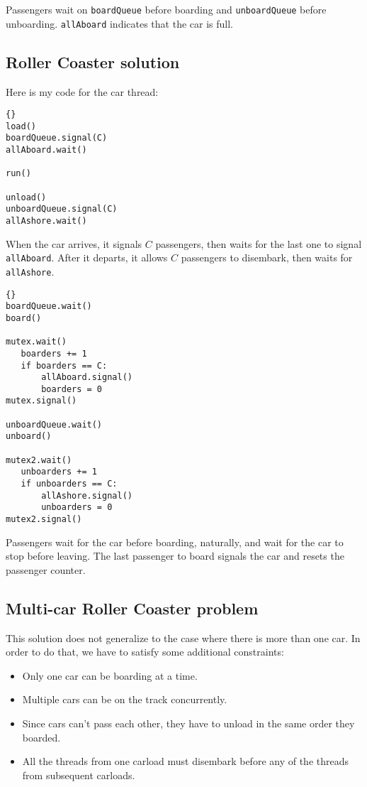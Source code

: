 \documentclass{book}
\newcommand{\clearemptydoublepage}{\newpage\cleardoublepage}
\begin{document}
Passengers wait on {\tt boardQueue} before boarding and
{\tt unboardQueue} before unboarding.  {\tt allAboard}
indicates that the car is full.


\clearemptydoublepage
\subsection{Roller Coaster solution}

Here is my code for the car thread:

\begin{lstlisting}[title={Roller Coaster solution (car)}]{}
load()
boardQueue.signal(C)
allAboard.wait()

run()

unload()
unboardQueue.signal(C)
allAshore.wait()
\end{lstlisting}

When the car arrives, it signals $C$ passengers,
then waits for the last one to signal {\tt allAboard}.
After it departs, it allows $C$ passengers to disembark,
then waits for {\tt allAshore}.

\begin{lstlisting}[title={Roller Coaster solution (passenger)}]{}
boardQueue.wait()
board()

mutex.wait()
   boarders += 1
   if boarders == C:
       allAboard.signal()
       boarders = 0
mutex.signal()

unboardQueue.wait()
unboard()

mutex2.wait()
   unboarders += 1
   if unboarders == C:
       allAshore.signal()
       unboarders = 0
mutex2.signal()
\end{lstlisting}

Passengers wait for the car before boarding, naturally, and wait for
the car to stop before leaving.  The last passenger to board signals
the car and resets the passenger counter.


\clearemptydoublepage
\subsection{Multi-car Roller Coaster problem}

This solution does not generalize to the case where there is more
than one car.  In order to do that, we have to satisfy some additional
constraints:

\begin{itemize}

\item Only one car can be boarding at a time.

\item Multiple cars can be on the track concurrently.

\item Since cars can't pass each other, they have to unload
in the same order they boarded.

\item All the threads from one carload must disembark before
any of the threads from subsequent carloads.

\end{itemize}
\end{document}
